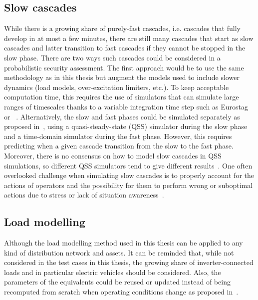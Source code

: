 
\subsection*{Slow cascades}

While there is a growing share of purely-fast cascades, i.e. cascades that fully develop in at most a few minutes, there are still many cascades that start as slow cascades and latter transition to fast cascades if they cannot be stopped in the slow phase. There are two ways such cascades could be considered in a probabilistic security assessment. The first approach would be to use the same methodology as in this thesis but augment the models used to include slower dynamics (load models, over-excitation limiters, etc.). To keep acceptable computation time, this requires the use of simulators that can simulate large ranges of timescales thanks to a variable integration time step such as Eurostag~\cite{STAG} or \Dynawo{}~\cite{Dynawo}. Alternatively, the slow and fast phases could be simulated separately as proposed in~\cite{TwoLevelPSA}, using a quasi-steady-state (QSS) simulator during the slow phase and a time-domain simulator during the fast phase. However, this requires predicting when a given cascade transition from the slow to the fast phase. Moreover, there is no consensus on how to model slow cascades in QSS simulations, so different QSS simulators tend to give different results~\cite{Benchmarking2018}. One often overlooked challenge when simulating slow cascades is to properly account for the actions of operators and the possibility for them to perform wrong or suboptimal actions due to stress or lack of situation awareness~\cite{Shahab_HRA, Panteli_Awareness}.

\subsection*{Load modelling}

Although the load modelling method used in this thesis can be applied to any kind of distribution network and assets. It can be reminded that, while not considered in the test cases in this thesis, the growing share of inverter-connected loads and in particular electric vehicles should be considered. Also, the parameters of the equivalents could be reused or updated instead of being recomputed from scratch when operating conditions change as proposed in~\cite{ChaspierreThesis}.

